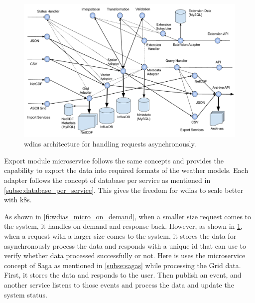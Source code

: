 \begin{figure}[htp]
    \centering
    \includegraphics[width=1\textwidth]{method/microservice/microservice_architecture-handle_on_async-v4.pdf}
    \caption{\acrshort{wdias} architecture for handling requests asynchronously.}
    \label{fi:wdias_micro_async}
\end{figure}
Export module microservice follows the same concepts and provides the capability to export the data into required formats of the weather models. Each adapter follows the concept of database per service as mentioned in \cref{subse:database_per_service}. This gives the freedom for \acrshort{wdias} to scale better with \acrshort{k8s}.

As shown in \cref{fi:wdias_micro_on_demand}, when a smaller size request comes to the system, it handles on-demand and response back. However, as shown in \cref{fi:wdias_micro_async}, when a request with a larger size comes to the system, it stores the data for asynchronously process the data and responds with a unique id that can use to verify whether data processed successfully or not. Here is uses the microservice concept of Saga as mentioned in \cref{subse:sagas} while processing the Grid data. First, it stores the data and responds to the user. Then publish an event, and another service listens to those events and process the data and update the system status.

